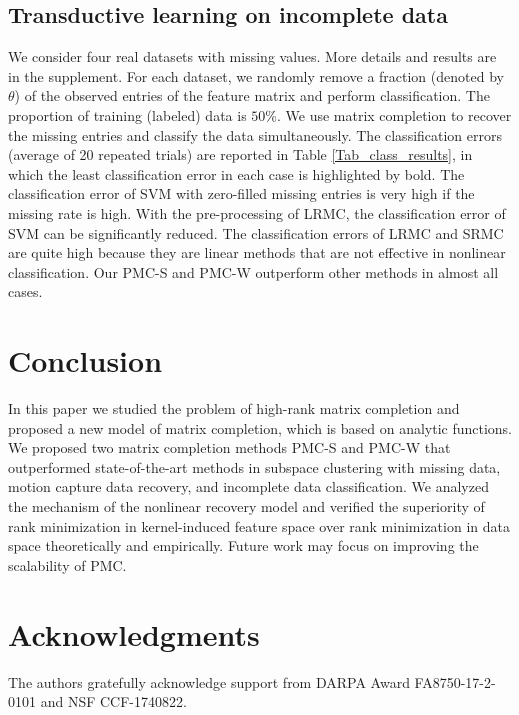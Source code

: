 \documentclass[letterpaper]{article} %
\begin{document}
\subsection{Transductive learning on incomplete data}
We consider four real datasets with missing values. More details and results are in the supplement. For each dataset, we randomly remove a fraction (denoted by $\theta$) of the observed entries of the feature matrix and perform classification. The proportion of training (labeled) data is $50\%$. We use matrix completion to recover the missing entries and classify the data simultaneously. The classification errors (average of 20 repeated trials) are reported in Table \ref{Tab_class_results}, in which the least classification error in each case is highlighted by bold. The classification error of SVM with zero-filled missing entries is very high if the missing rate is high. With the pre-processing of LRMC, the classification error of SVM can be significantly reduced. The classification errors of LRMC and SRMC are quite high because they are linear methods that are not effective in nonlinear classification. Our PMC-S and PMC-W outperform other methods in almost all cases.


\section{Conclusion}
In this paper we studied the problem of high-rank matrix completion and proposed a new model of matrix completion, which is based on analytic functions. We proposed two matrix completion methods PMC-S and PMC-W that outperformed state-of-the-art methods in subspace clustering with missing data, motion capture data recovery, and incomplete data classification. We analyzed the mechanism of the nonlinear recovery model and verified the superiority of rank minimization in kernel-induced feature space over rank minimization in data space theoretically and empirically. Future work may focus on improving the scalability of PMC.

\section{ Acknowledgments}
The authors gratefully acknowledge support from DARPA Award FA8750-17-2-0101 and NSF CCF-1740822.




\fontsize{9.5pt}{10.3pt}\selectfont
\end{document}
